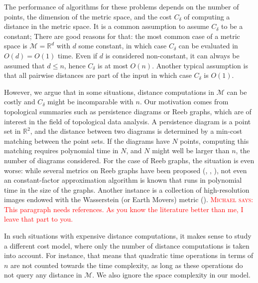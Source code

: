 \documentclass[a4paper,USenglish]{socg-lipics-v2018}
\newcommand{\R}{\mathbb{R}}
\newcommand{\metricspace}{\mathcal{M}}
\newcommand{\dist}{\delta}
\newcommand{\complexity}{C_{\dist}}
\def\marrow{\marginpar[\hfill$\longrightarrow$]{$\longleftarrow$}}
\def\michael#1{\textcolor{red}{\textsc{Michael says: }{\marrow\sf #1}}}
\begin{document}
The performance of algorithms for these problems depends on the number of points,
the dimension of the metric space, and the cost $\complexity$ of computing a distance in the metric space.
It is a common assumption to assume $\complexity$ to be a constant; 
There are good reasons for that: the most common case of a metric space
is $\metricspace=\R^d$ with $d$ some constant, in which case $\complexity$ can be evaluated in $O(d)=O(1)$ time.
Even if $d$ is considered non-constant,
it can always be assumed that $d\leq n$, hence $\complexity$ is at most $O(n)$.
Another typical assumption is that all pairwise distances are part of the input
in which case $\complexity$ is $O(1)$.

However, we argue that in some situations, distance computations
in $\metricspace$ can be costly and $\complexity$ might be incomparable
with $n$. Our motivation comes from topological summaries
such as persistence diagrams or Reeb graphs, which are of interest
in the field of topological data analysis. A persistence diagram
is a point set in $\R^2$, and the distance between two diagrams
is determined by a min-cost matching between the point sets.
If the diagrams have $N$ points, computing this matching requires
polynomial time in $N$, and $N$ might well be larger than $n$, the number
of diagrams considered. For the case of Reeb graphs, the situation is even
worse: while several metrics on Reeb graphs have been proposed (\cite{bauer2014measuring}, \cite{de2016categorified},
\cite{di2016edit}),
not even an constant-factor approximation algorithm is known that runs
in polynomial time in the size of the graphs.
Another instance is a collection of high-resolution images
endowed with the Wasserstein (or Earth Movers) metric (\cite{rubner2000earth}).
\michael{This paragraph needs references. As you know the literature better than me,
I leave that part to you.}

In such situations with expensive distance computations, 
it makes sense to study a different cost model, where only the number of distance computations
is taken into account. For instance, that means that quadratic time operations in terms of $n$
are not counted towards the time complexity, as long as these operations do not query any distance
in $\metricspace$. We also ignore the space complexity in our model.
\end{document}
